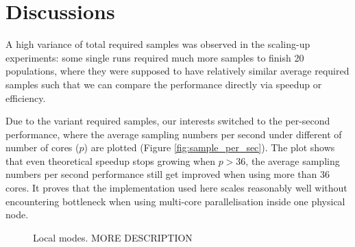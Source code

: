 \section{Discussions}

A high variance of total required samples was observed in the scaling-up experiments: some single runs required much more samples to finish 20 populations, where they were supposed to have relatively similar average required samples such that we can compare the performance directly via speedup or efficiency.

Due to the variant required samples, our interests switched to the per-second performance, where the average sampling numbers per second under different of number of cores ($p$) are plotted (Figure \ref{fig:sample_per_sec}). The plot shows that even theoretical speedup stops growing when $p>36$, the average sampling numbers per second performance still get improved when using more than 36 cores. It proves that the implementation used here scales reasonably well without encountering bottleneck when using multi-core parallelisation inside one physical node.

\begin{figure}[ht]
    \begin{center}
    \end{center}

    \caption[TODO]{Local modes. MORE DESCRIPTION}
    \label{fig:local_modes}
\end{figure}

